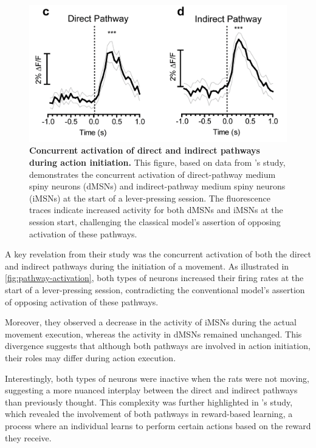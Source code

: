 \documentclass[10pt]{article}
\begin{document}
\begin{sloppypar}
  \begin{figure}[ht]
    \centering
    \includegraphics[width=\textwidth]{figures/direct-indirect-activation.png}
    \caption[Concurrent activation of direct and indirect pathways during action initiation]{\textbf{Concurrent activation of direct and indirect pathways during action initiation.} This figure, based on data from \cite{cui_concurrent_2013}’s study, demonstrates the concurrent activation of direct-pathway medium spiny neurons (dMSNs) and indirect-pathway medium spiny neurons (iMSNs) at the start of a lever-pressing session. The fluorescence traces indicate increased activity for both dMSNs and iMSNs at the session start, challenging the classical model’s assertion of opposing activation of these pathways.}
    \label{fig:pathway-activation}
  \end{figure}

  A key revelation from their study was the concurrent activation of both the direct and indirect pathways during the initiation of a movement. As illustrated in \autoref{fig:pathway-activation}, both types of neurons increased their firing rates at the start of a lever-pressing session, contradicting the conventional model’s assertion of opposing activation of these pathways.

  Moreover, they observed a decrease in the activity of iMSNs during the actual movement execution, whereas the activity in dMSNs remained unchanged. This divergence suggests that although both pathways are involved in action initiation, their roles may differ during action execution.

  Interestingly, both types of neurons were inactive when the rats were not moving, suggesting a more nuanced interplay between the direct and indirect pathways than previously thought. This complexity was further highlighted in \cite{guillaumin_experimental_2021}’s study, which revealed the involvement of both pathways in reward-based learning, a process where an individual learns to perform certain actions based on the reward they receive.


\end{sloppypar}
\end{document}
